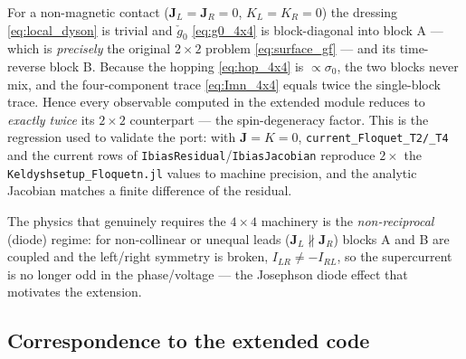 \documentclass[11pt,a4paper]{article}
\begin{document}
For a non-magnetic contact ($\mathbf J_L=\mathbf J_R=0$, $K_L=K_R=0$) the dressing
\eqref{eq:local_dyson} is trivial and $\check g_0$ \eqref{eq:g0_4x4} is
block-diagonal into block A --- which is \emph{precisely} the original $2\times2$
problem \eqref{eq:surface_gf} --- and its time-reverse block B.  Because the
hopping \eqref{eq:hop_4x4} is $\propto\sigma_0$, the two blocks never mix, and the
four-component trace \eqref{eq:Imn_4x4} equals twice the single-block trace.
Hence every observable computed in the extended module reduces to \emph{exactly
twice} its $2\times2$ counterpart --- the spin-degeneracy factor.  This is the
regression used to validate the port: with $\mathbf J=K=0$,
\texttt{current\_Floquet\_T2/\_T4} and the current rows of
\texttt{IbiasResidual}/\texttt{IbiasJacobian} reproduce $2\times$ the
\texttt{Keldyshsetup\_Floquetn.jl} values to machine precision, and the analytic
Jacobian matches a finite difference of the residual.

The physics that genuinely requires the $4\times4$ machinery is the
\emph{non-reciprocal} (diode) regime: for non-collinear or unequal leads
($\mathbf J_L\nparallel\mathbf J_R$) blocks A and B are coupled and the left/right
symmetry is broken, $I_{LR}\neq-I_{RL}$, so the supercurrent is no longer odd in
the phase/voltage --- the Josephson diode effect that motivates the extension.

\subsection{Correspondence to the extended code}
\label{sec:ysr_codemap}
\end{document}
